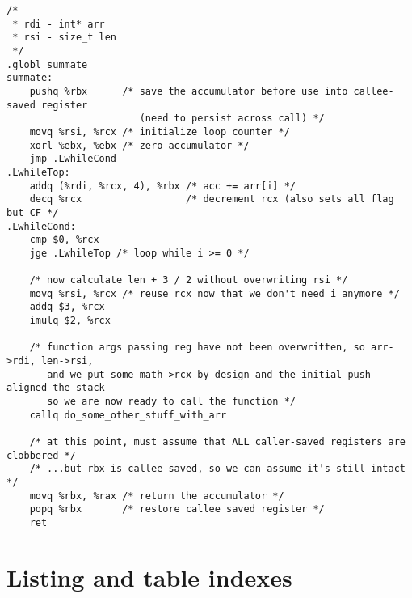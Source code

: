 \documentclass[11pt]{article}
\begin{document}
\begin{lstlisting}[caption={Possible assembly implementation of the above example}, captionpos=b]
/*
 * rdi - int* arr
 * rsi - size_t len
 */
.globl summate
summate:
    pushq %rbx      /* save the accumulator before use into callee-saved register
                       (need to persist across call) */
    movq %rsi, %rcx /* initialize loop counter */
    xorl %ebx, %ebx /* zero accumulator */
    jmp .LwhileCond
.LwhileTop:
    addq (%rdi, %rcx, 4), %rbx /* acc += arr[i] */
    decq %rcx                  /* decrement rcx (also sets all flag but CF */
.LwhileCond:
    cmp $0, %rcx
    jge .LwhileTop /* loop while i >= 0 */

    /* now calculate len + 3 / 2 without overwriting rsi */
    movq %rsi, %rcx /* reuse rcx now that we don't need i anymore */
    addq $3, %rcx
    imulq $2, %rcx

    /* function args passing reg have not been overwritten, so arr->rdi, len->rsi,
       and we put some_math->rcx by design and the initial push aligned the stack
       so we are now ready to call the function */
    callq do_some_other_stuff_with_arr

    /* at this point, must assume that ALL caller-saved registers are clobbered */
    /* ...but rbx is callee saved, so we can assume it's still intact */
    movq %rbx, %rax /* return the accumulator */
    popq %rbx       /* restore callee saved register */
    ret
\end{lstlisting}

\newpage
\section{Listing and table indexes}
\lstlistoflistings
\listoftables
\end{document}
